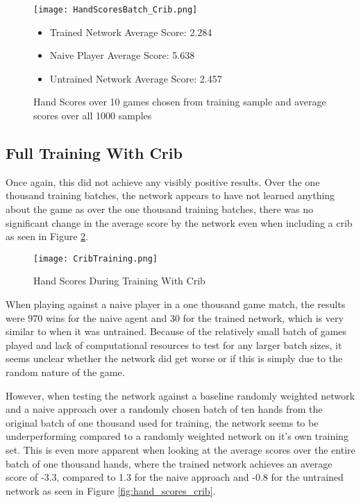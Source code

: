 \documentclass[]{article}
\begin{document}
\begin{figure}
    \caption{Hand Scores over 10 games chosen from training sample and average scores over all 1000 samples}\label{fig:hand_scores_nocrib}

    \texttt{[image: HandScoresBatch\_Crib.png]}
    \begin{itemize}
        \item Trained Network Average Score: 2.284
        \item Naive Player Average Score: 5.638
        \item Untrained Network Average Score: 2.457
    \end{itemize}

\end{figure}

\subsection{Full Training With Crib}

Once again, this did not achieve any visibly positive results. Over the one thousand training batches, the network appears to have not learned anything about the game as over the one thousand training batches, there was no significant change in the average score by the network even when including a crib as seen in Figure \ref{fig:training_crib}.

\begin{figure}
    \caption{Hand Scores During Training With Crib}\label{fig:training_crib}

    \texttt{[image: CribTraining.png]}
\end{figure}

When playing against a naive player in a one thousand game match, the results were 970 wins for the naive agent and 30 for the trained network, which is very similar to when it was untrained. Because of the relatively small batch of games played and lack of computational resources to test for any larger batch sizes, it seems unclear whether the network did get worse or if this is simply due to the random nature of the game.

However, when testing the network against a baseline randomly weighted network and a naive approach over a randomly chosen batch of ten hands from the original batch of one thousand used for training, the network seems to be underperforming compared to a randomly weighted network on it's own training set. This is even more apparent when looking at the average scores over the entire batch of one thousand hands, where the trained network achieves an average score of -3.3, compared to 1.3 for the naive approach and -0.8 for the untrained network as seen in Figure \ref{fig:hand_scores_crib}.
\end{document}
